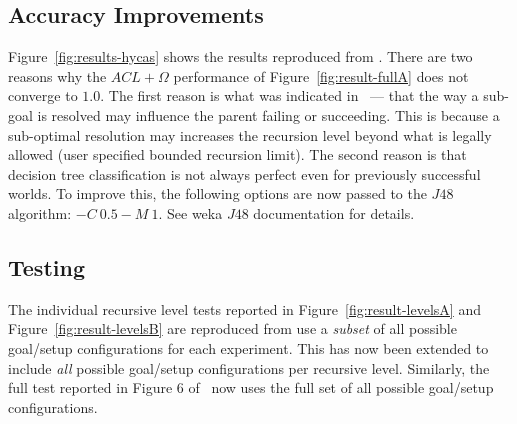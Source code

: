 \documentclass[a4paper]{article}
\begin{document}
\begin{figure*}[t]
\begin{center}
\qquad
{}
\qquad
{}
\qquad
{}
\caption{Agent performance under $ACL$ and $ACL+\Omega$ schemes. Each point represents results from $5$ experiment runs using an averaging window of $100$ samples. Reproduced from \cite{Singh:HYCAS10}.}
\label{fig:results-hycas}
\end{center}
\end{figure*}


\subsection{Accuracy Improvements}


Figure~\ref{fig:results-hycas} shows the results reproduced from \cite{Singh:HYCAS10}. There are two reasons why the $ACL+\Omega$ performance of Figure~\ref{fig:result-fullA} does not converge to $1.0$. The first reason is what was indicated in~\cite{Singh:HYCAS10} --- that the way a sub-goal is resolved may influence the parent failing or succeeding. This is because a sub-optimal resolution may increases the recursion level beyond what is legally allowed (user specified bounded recursion limit). The second reason is that decision tree classification is not always perfect even for previously successful worlds. To improve this, the following options are now passed to the $J48$ algorithm: $-C~0.5 -M~1$. See weka $J48$ documentation for details.


\subsection{Testing}

The individual recursive level tests reported in Figure~\ref{fig:result-levelsA} and Figure~\ref{fig:result-levelsB} are reproduced from \cite{Singh:HYCAS10} use a \textit{subset} of all possible goal/setup configurations for each experiment. This has now been extended to include \textit{all} possible goal/setup configurations per recursive level. Similarly, the full test reported in Figure 6 of~\cite{Singh:HYCAS10} now uses the full set of all possible goal/setup configurations.
\end{document}
